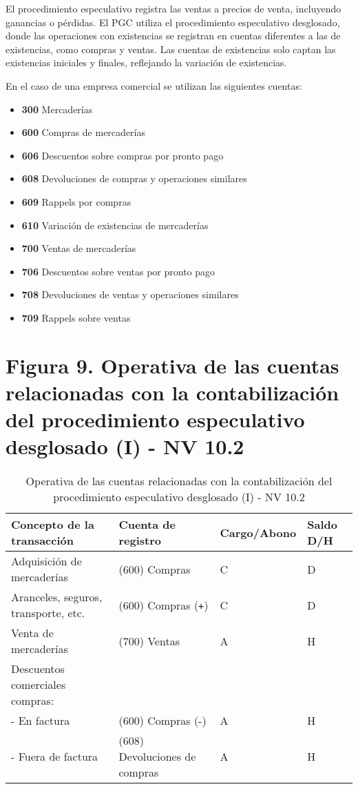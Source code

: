 \documentclass{article}
\begin{document}
El procedimiento especulativo registra las ventas a precios de venta, incluyendo ganancias o pérdidas. El PGC utiliza el procedimiento especulativo desglosado, donde las operaciones con existencias se registran en cuentas diferentes a las de existencias, como compras y ventas. Las cuentas de existencias solo captan las existencias iniciales y finales, reflejando la variación de existencias.

En el caso de una empresa comercial se utilizan las siguientes cuentas:

\begin{itemize}
    \item \textbf{300} Mercaderías
    \item \textbf{600} Compras de mercaderías
    \item \textbf{606} Descuentos sobre compras por pronto pago
    \item \textbf{608} Devoluciones de compras y operaciones similares
    \item \textbf{609} Rappels por compras
    \item \textbf{610} Variación de existencias de mercaderías
    \item \textbf{700} Ventas de mercaderías
    \item \textbf{706} Descuentos sobre ventas por pronto pago
    \item \textbf{708} Devoluciones de ventas y operaciones similares
    \item \textbf{709} Rappels sobre ventas
\end{itemize}

\section*{Figura 9. Operativa de las cuentas relacionadas con la contabilización del procedimiento especulativo desglosado (I) - NV 10.2}

\begin{table}[H]
\centering
\begin{tabular}{|p{4cm}|p{4cm}|p{4cm}|p{4cm}|}
\hline
\textbf{Concepto de la transacción} & \textbf{Cuenta de registro} & \textbf{Cargo/Abono} & \textbf{Saldo D/H} \\
\hline
Adquisición de mercaderías & (600) Compras & C & D \\
\hline
Aranceles, seguros, transporte, etc. & (600) Compras (\texttt{+}) & C & D \\
\hline
Venta de mercaderías & (700) Ventas & A & H \\
\hline
Descuentos comerciales compras: &  &  &  \\
- En factura & (600) Compras (-) & A & H \\
- Fuera de factura & (608) Devoluciones de compras & A & H \\
\hline
\end{tabular}
\caption{Operativa de las cuentas relacionadas con la contabilización del procedimiento especulativo desglosado (I) - NV 10.2}
\end{table}
\end{document}
